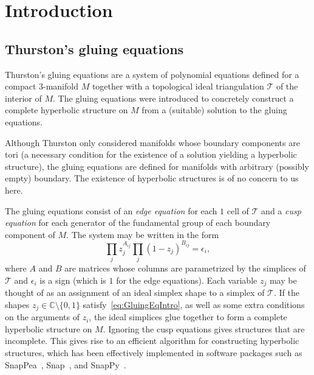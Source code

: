 \documentclass[12pt]{amsart}
\theoremstyle{definition}
\numberwithin{equation}{section}
\def\e{\epsilon}
\def\C{\mathbb{C}}
\def\T{\mathcal{T}}
\begin{document}
\date{July 25, 2012}%

\maketitle

\tableofcontents

\section{Introduction}

\subsection{Thurston's gluing equations}
\label{sub.ge}


Thurston's gluing equations are a system of polynomial equations defined for 
a compact $3$-manifold $M$ together with a topological ideal triangulation 
$\T$ of the interior of $M$. The gluing equations were introduced to concretely construct a complete hyperbolic structure on $M$ from a (suitable) solution to the gluing equations. 

Although Thurston only considered manifolds whose boundary components are tori (a necessary condition for the existence of a solution yielding a hyperbolic structure), the gluing equations are defined for manifolds with arbitrary (possibly empty) boundary. The existence of hyperbolic structures is of no concern to us here.

The gluing equations consist of an \emph{edge equation} for each $1$ cell of $\T$ and a \emph{cusp equation} for each generator of the fundamental group of each boundary component of $M$. The system may be written in the form
\begin{equation}\label{eq:GluingEqIntro}
\prod_j z_j^{A_{ij}} \prod_j (1-z_j)^{B_{ij}}=\e_i,
\end{equation}
where $A$ and $B$ are matrices whose columns are parametrized by the simplices of $\T$ and $\e_i$ is a sign (which is $1$ for the edge equations). Each variable $z_j$ may be thought of as an assignment of an ideal simplex shape to a simplex of $\T$. If the shapes $z_j\in\C\setminus\{0,1\}$ satisfy~\eqref{eq:GluingEqIntro}, as well as some extra conditions on the arguments of $z_i$, the ideal simplices glue together to form a complete hyperbolic structure on $M$. Ignoring the cusp equations gives structures that are incomplete. This gives rise to an efficient algorithm for constructing hyperbolic structures, which has been effectively implemented in software packages such as SnapPea~\cite{SnapPea}, Snap~\cite{snapprogram}, and SnapPy~\cite{SnapPy}. %
\end{document}
